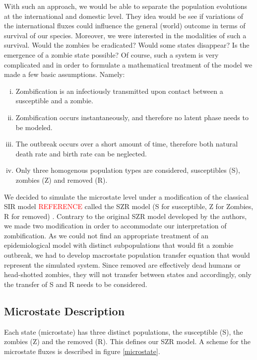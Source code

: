 \documentclass[11pt]{article} %
\begin{document}
With such an approach, we would be able to separate the population evolutions at the international and domestic level. They idea would be see if variations of the international fluxes could influence the general (world) outcome in terms of survival of our species. Moreover, we were interested in the modalities of such a survival. Would the zombies be eradicated? Would some states disappear? Is the emergence of a zombie state possible? Of course, such a system is very complicated and in order to formulate a mathematical treatment of the model we made a few basic assumptions. Namely:
\begin{enumerate}[i.]
	\item Zombification is an infectiously transmitted upon contact between a susceptible and a zombie.
	\item Zombification occurs instantaneously, and therefore no latent phase needs to be modeled.
	\item The outbreak occurs over a short amount of time, therefore both natural death rate and birth rate can be neglected.
	\item Only three homogenous population types are considered, susceptibles (S), zombies (Z) and removed (R).
\end{enumerate}

We decided to simulate the microstate level under a modification of the classical SIR model \textcolor{red}{REFERENCE} called the SZR model (S for susceptible, Z for Zombies, R for removed) \cite{munz2009zombies}. Contrary to the original SZR model developed by the authors, we made two modification in order to accommodate our interpretation of zombification. As we could not find an appropriate treatment of an epidemiological model with distinct subpopulations that would fit a zombie outbreak, we had to develop macrostate population transfer equation that would represent the simulated system. Since removed are effectively dead humans or head-shotted zombies, they will not transfer between states and accordingly, only the transfer of S and R needs to be considered. 

\subsection{Microstate Description}\indent
\label{sec:microdescription}

Each state (microstate) has three distinct populations, the susceptible (S), the zombies (Z) and the removed (R). This defines our SZR model. A scheme for the microstate fluxes is described in figure \ref{microstate}.
\end{document}
